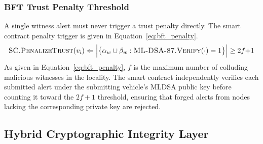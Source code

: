 \documentclass[12pt, a4paper]{report}
\begin{document}
\subsubsection{BFT Trust Penalty Threshold}
A single witness alert must never trigger a trust
penalty directly. The smart contract penalty trigger
is given in Equation~\eqref{eq:bft_penalty}.
\begin{equation}
\textsc{SC.PenalizeTrust}(v_i) \Leftarrow
\Bigl|\bigl\{\alpha_w \cup \beta_w :
\textsc{ML-DSA-87.Verify}(\cdot) = 1
\bigr\}\Bigr|
\geq 2f{+}1
\label{eq:bft_penalty}
\end{equation}
As given in Equation~\eqref{eq:bft_penalty}, $f$
is the maximum number of colluding malicious
witnesses in the locality. The smart contract
independently verifies each submitted alert under
the submitting vehicle's \ac{MLDSA} public key
before counting it toward the $2f{+}1$ threshold,
ensuring that forged alerts from nodes lacking
the corresponding private key are rejected.



\subsection{Hybrid Cryptographic Integrity Layer}
\label{sec:crypto_layer}
\end{document}

